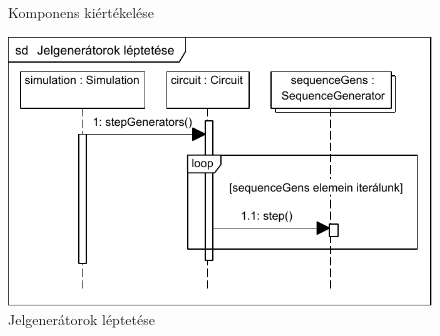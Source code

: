 \begin{figure}[H]
\begin{center}
\caption{Komponens kiértékelése}
\label{fig:component_sim}
\end{center}
\end{figure}

\begin{figure}[H]
\begin{center}
\includegraphics{chapters/chapter03/seqdiagrams/jelgeneratorok_leptetese.pdf}
\caption{Jelgenerátorok léptetése}
\label{fig:step_gens}
\end{center}
\end{figure}



